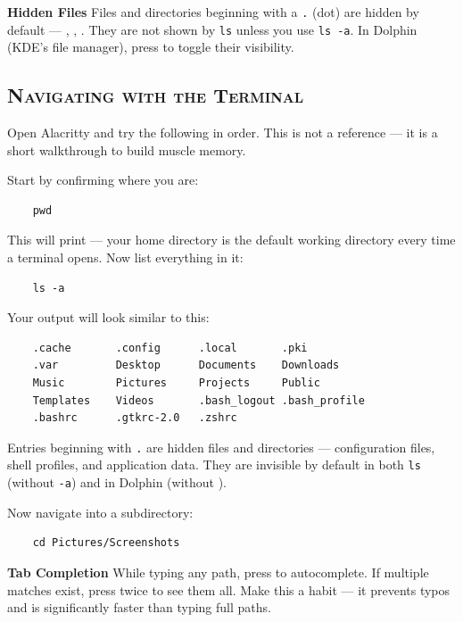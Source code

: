\documentclass{article}
\newcommand{\code}[1]{\colorbox{codebg}{\texttt{#1}}}
\begin{document}
\begin{callout}{\textbf{Hidden Files}}
	Files and directories beginning with a \code{.} (dot) are hidden by default ---
	, , . They are not shown
	by \code{ls} unless you use \code{ls -a}. In Dolphin (KDE's file manager), press
	 to toggle their visibility.
\end{callout}

\subsection{\textsc{Navigating with the Terminal}}

Open Alacritty and try the following in order. This is not a reference --- it is a
short walkthrough to build muscle memory.

Start by confirming where you are:

\begin{verbatim}
	pwd
\end{verbatim}

This will print  --- your home directory is the default
working directory every time a terminal opens. Now list everything in it:

\begin{verbatim}
	ls -a
\end{verbatim}

Your output will look similar to this:

\begin{verbatim}
	.cache       .config      .local       .pki
	.var         Desktop      Documents    Downloads
	Music        Pictures     Projects     Public
	Templates    Videos       .bash_logout .bash_profile
	.bashrc      .gtkrc-2.0   .zshrc
\end{verbatim}

Entries beginning with \code{.} are hidden files and directories --- configuration
files, shell profiles, and application data. They are invisible by default in both
\code{ls} (without \code{-a}) and in Dolphin (without ).

Now navigate into a subdirectory:

\begin{verbatim}
	cd Pictures/Screenshots
\end{verbatim}

\begin{callout}{\textbf{Tab Completion}}
	While typing any path, press  to autocomplete. If multiple matches exist,
	press  twice to see them all. Make this a habit --- it prevents typos and
	is significantly faster than typing full paths.
\end{callout}
\end{document}
